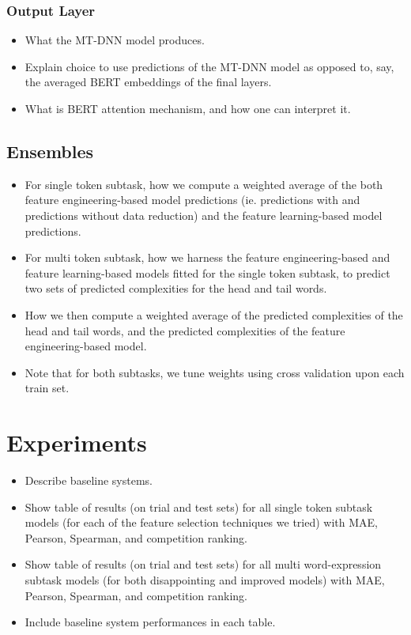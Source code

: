 \documentclass[11pt,a4paper]{article}
\begin{document}
\subsubsection{Output Layer}
\begin{itemize}
  \item What the MT-DNN model produces.
  \item Explain choice to use predictions of the MT-DNN model as opposed to, say, the averaged BERT embeddings of the final layers.
  \item What is BERT attention mechanism, and how one can interpret it.
\end{itemize}

\subsection{Ensembles}
\begin{itemize}
  \item For single token subtask, how we compute a weighted average of the both feature engineering-based model predictions (ie. predictions with and predictions without data reduction) and the feature learning-based model predictions.
  \item For multi token subtask, how we harness the feature engineering-based and feature learning-based models fitted for the single token subtask, to predict two sets of predicted complexities for the head and tail words.
  \item How we then compute a weighted average of the predicted complexities of the head and tail words, and the predicted complexities of the feature engineering-based model.
  \item Note that for both subtasks, we tune weights using cross validation upon each train set.
\end{itemize}

\section{Experiments}

\begin{itemize}
  \item Describe baseline systems.
  \item Show table of results (on trial and test sets) for all single token subtask models (for each of the feature selection techniques we tried) with MAE, Pearson, Spearman, and competition ranking.
  \item Show table of results (on trial and test sets) for all multi word-expression subtask models (for both disappointing and improved models) with MAE, Pearson, Spearman, and competition ranking.
  \item Include baseline system performances in each table.
\end{itemize}
\end{document}
